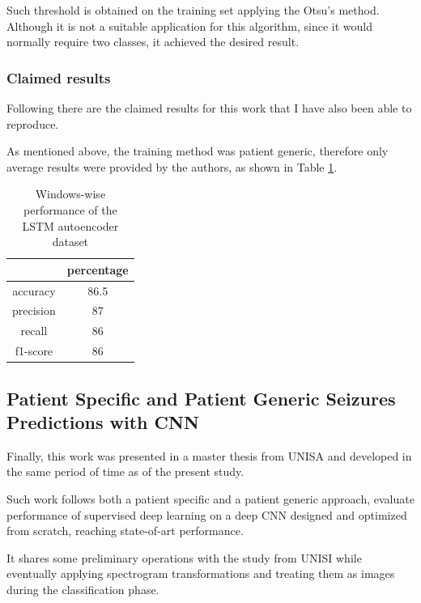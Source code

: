 Such threshold is obtained on the training set applying the Otsu's method. Although it is not a suitable application for this algorithm, since it would normally require two classes, it achieved the desired result.

\subsubsection{Claimed results}
Following there are the claimed results for this work that I have also been able to reproduce.

As mentioned above, the training method was patient generic, therefore only average results were provided by the authors, as shown in Table \ref{tab:lstm-autoencoder-performance-spagnolo}.

\begin{table}[ht]
    \centering
    \begin{tabular}{c|c}
                  & percentage \\ \hline
        accuracy  & 86.5       \\
        precision & 87         \\
        recall    & 86         \\
        f1-score  & 86         \\ \hline
    \end{tabular}
    \caption{Windows-wise performance of the LSTM autoencoder  dataset}
    \label{tab:lstm-autoencoder-performance-spagnolo} 
\end{table}


\subsection{Patient Specific and Patient Generic Seizures Predictions with CNN} \label{subsec:refwork-unisa}
Finally, this work was presented in a master thesis from \gls{UNISA} and developed in the same period of time as of the present study.

Such work follows both a patient specific and a patient generic approach, evaluate performance of supervised deep learning on a deep \gls{CNN} designed and optimized from scratch, reaching state-of-art performance.

It shares some preliminary operations with the study from \gls{UNISI} while eventually applying spectrogram transformations and treating them as images during the classification phase.



